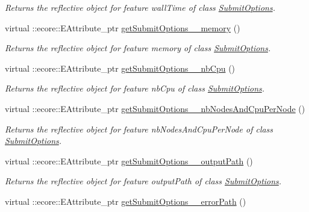 \begin{DoxyCompactItemize}
\begin{DoxyCompactList}\small\item\em Returns the reflective object for feature wallTime of class \hyperlink{classTMS__Data_1_1SubmitOptions}{SubmitOptions}. \item\end{DoxyCompactList}\item 
virtual ::ecore::EAttribute\_\-ptr \hyperlink{classTMS__Data_1_1TMS__DataPackage_a44bdc1bbea497dfabb81de2d4a356dfa}{getSubmitOptions\_\-\_\-memory} ()
\begin{DoxyCompactList}\small\item\em Returns the reflective object for feature memory of class \hyperlink{classTMS__Data_1_1SubmitOptions}{SubmitOptions}. \item\end{DoxyCompactList}\item 
virtual ::ecore::EAttribute\_\-ptr \hyperlink{classTMS__Data_1_1TMS__DataPackage_a517b03d2354cf1c5eb225242341d4e87}{getSubmitOptions\_\-\_\-nbCpu} ()
\begin{DoxyCompactList}\small\item\em Returns the reflective object for feature nbCpu of class \hyperlink{classTMS__Data_1_1SubmitOptions}{SubmitOptions}. \item\end{DoxyCompactList}\item 
virtual ::ecore::EAttribute\_\-ptr \hyperlink{classTMS__Data_1_1TMS__DataPackage_aa0147a3f5a0aad1cdd4d1ea9903c3757}{getSubmitOptions\_\-\_\-nbNodesAndCpuPerNode} ()
\begin{DoxyCompactList}\small\item\em Returns the reflective object for feature nbNodesAndCpuPerNode of class \hyperlink{classTMS__Data_1_1SubmitOptions}{SubmitOptions}. \item\end{DoxyCompactList}\item 
virtual ::ecore::EAttribute\_\-ptr \hyperlink{classTMS__Data_1_1TMS__DataPackage_a5a2cf235dabd974cf79149d0641e361d}{getSubmitOptions\_\-\_\-outputPath} ()
\begin{DoxyCompactList}\small\item\em Returns the reflective object for feature outputPath of class \hyperlink{classTMS__Data_1_1SubmitOptions}{SubmitOptions}. \item\end{DoxyCompactList}\item 
virtual ::ecore::EAttribute\_\-ptr \hyperlink{classTMS__Data_1_1TMS__DataPackage_aa5fee743976b8362829505c3a94d235b}{getSubmitOptions\_\-\_\-errorPath} ()

\end{DoxyCompactItemize}
